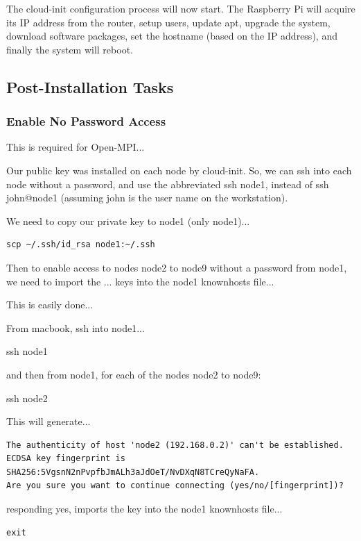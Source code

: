 \documentclass{article}
\begin{document}
The cloud-init configuration process will now start. The Raspberry Pi will acquire its IP address from the router, setup users, update apt, upgrade the system, download software packages, set the hostname (based on the IP address), and finally the system will reboot.


\subsection{Post-Installation Tasks}

\subsubsection{Enable No Password Access}

This is required for Open-MPI...

Our public key was installed on each node by cloud-init. So, we can ssh into each node without a password, and use the abbreviated ssh node1, instead of ssh john@node1 (assuming john is the user name on the workstation).

We need to copy our private key to node1 (only node1)...

\begin{lstlisting}[]
scp ~/.ssh/id_rsa node1:~/.ssh
\end{lstlisting}

Then to enable access to nodes node2 to node9 without a password from node1, we need to import the ... keys into the node1 knownhosts file...

This is easily done...

From macbook, ssh into node1...

ssh node1

and then from node1, for each of the nodes node2 to node9:

ssh node2

This will generate...

\begin{lstlisting}[]
The authenticity of host 'node2 (192.168.0.2)' can't be established.
ECDSA key fingerprint is SHA256:5VgsnN2nPvpfbJmALh3aJdOeT/NvDXqN8TCreQyNaFA.
Are you sure you want to continue connecting (yes/no/[fingerprint])?
\end{lstlisting}

responding yes, imports the key into the node1 knownhosts file...

\begin{lstlisting}[]
exit
\end{lstlisting}
\end{document}
